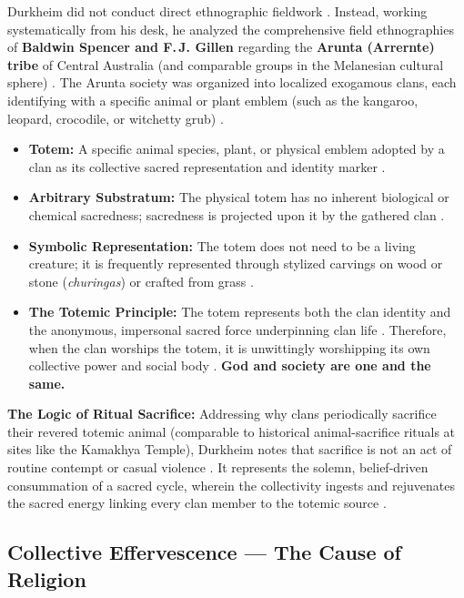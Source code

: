 Durkheim did not conduct direct ethnographic fieldwork . Instead, working systematically from his desk, he analyzed the comprehensive field ethnographies of \textbf{Baldwin Spencer and F.\,J. Gillen} regarding the \textbf{Arunta (Arrernte) tribe} of Central Australia (and comparable groups in the Melanesian cultural sphere) . The Arunta society was organized into localized exogamous clans, each identifying with a specific animal or plant emblem (such as the kangaroo, leopard, crocodile, or witchetty grub) .

\begin{KeyConcept}
\begin{itemize}
    \item \textbf{Totem:} A specific animal species, plant, or physical emblem adopted by a clan as its collective sacred representation and identity marker .
    \item \textbf{Arbitrary Substratum:} The physical totem has no inherent biological or chemical sacredness; sacredness is projected upon it by the gathered clan .
    \item \textbf{Symbolic Representation:} The totem does not need to be a living creature; it is frequently represented through stylized carvings on wood or stone (\textit{churingas}) or crafted from grass .
    \item \textbf{The Totemic Principle:} The totem represents both the clan identity and the anonymous, impersonal sacred force underpinning clan life . Therefore, when the clan worships the totem, it is unwittingly worshipping its own collective power and social body . \textbf{God and society are one and the same.}
\end{itemize}
\end{KeyConcept}

\begin{ExampleBox}
\textbf{The Logic of Ritual Sacrifice:}
Addressing why clans periodically sacrifice their revered totemic animal (comparable to historical animal-sacrifice rituals at sites like the Kamakhya Temple), Durkheim notes that sacrifice is not an act of routine contempt or casual violence . It represents the solemn, belief-driven consummation of a sacred cycle, wherein the collectivity ingests and rejuvenates the sacred energy linking every clan member to the totemic source .
\end{ExampleBox}

\subsection{Collective Effervescence --- The Cause of Religion}

